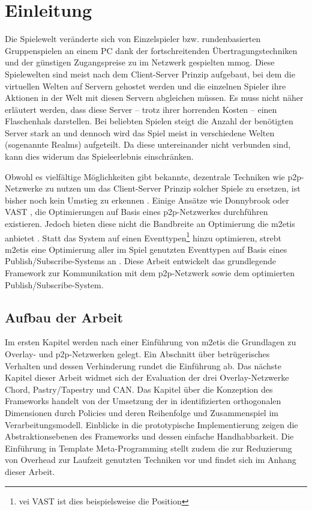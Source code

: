 \chapter{Einleitung}
\label{chap:einleitung}
Die Spielewelt veränderte sich von Einzelspieler bzw. rundenbasierten Gruppenspielen an einem PC dank der fortschreitenden Übertragungstechniken und der günstigen Zugangspreise zu im Netzwerk gespielten \ac{mmog}. Diese Spielewelten sind meist nach dem Client-Server Prinzip aufgebaut, bei dem die virtuellen Welten auf Servern gehostet werden und die einzelnen Spieler ihre Aktionen in der Welt mit diesen Servern abgleichen müssen. Es muss nicht näher erläutert werden, dass diese Server -- trotz ihrer horrenden Kosten -- einen Flaschenhals darstellen. Bei beliebten Spielen steigt die Anzahl der benötigten Server stark an  und dennoch wird das Spiel meist in verschiedene Welten (sogenannte Realms) aufgeteilt. Da diese untereinander nicht verbunden sind, kann dies widerum das Spieleerlebnis einschränken.

Obwohl es vielfältige Möglichkeiten gibt bekannte, dezentrale Techniken wie \ac{p2p}-Netzwerke zu nutzen um das Client-Server Prinzip solcher Spiele zu ersetzen, ist bisher noch kein Umstieg zu erkennen \cite{Knutsson2004Peertopeer, Triebel2008Peertopeer}. Einige Ansätze wie Donnybrook \cite{Bharambe2008Donnybrook} oder VAST \cite{Backhaus2007Voronoibased}, die Optimierungen auf Basis eines \ac{p2p}-Netzwerkes durchführen existieren. Jedoch bieten diese nicht die Bandbreite an Optimierung die \ac{m2etis} anbietet \cite{Fischer2010Event}. Statt das System auf einen Eventtypen\footnote{vei VAST ist dies beispielsweise die Position} hinzu optimieren, strebt \ac{m2etis} eine Optimierung aller im Spiel genutzten Eventtypen auf Basis eines Publish/Subscribe-Systems an \cite{Fischer2010a}. Diese Arbeit entwickelt das grundlegende Framework zur Kommunikation mit dem \ac{p2p}-Netzwerk sowie dem optimierten Publish/Subscribe-System.

\section{Aufbau der Arbeit}
Im ersten Kapitel werden nach einer Einführung von \ac{m2etis} die Grundlagen zu Overlay- und p2p-Netzwerken gelegt. Ein Abschnitt über betrügerisches Verhalten und dessen Verhinderung rundet die Einführung ab. Das nächste Kapitel dieser Arbeit widmet sich der Evaluation der drei Overlay-Netzwerke Chord, Pastry/Tapestry und CAN. Das Kapitel über die Konzeption des Frameworks handelt von der Umsetzung der in \cite{Fischer2010Event} identifizierten orthogonalen Dimensionen durch Policies und deren Reihenfolge und Zusammenspiel im Verarbeitungsmodell. Einblicke in die prototypische Implementierung zeigen die Abstraktionsebenen des Frameworks und dessen einfache Handhabbarkeit. Die Einführung in Template Meta-Programming stellt zudem die zur Reduzierung von Overhead zur Laufzeit genutzten Techniken vor und findet sich im Anhang dieser Arbeit.
